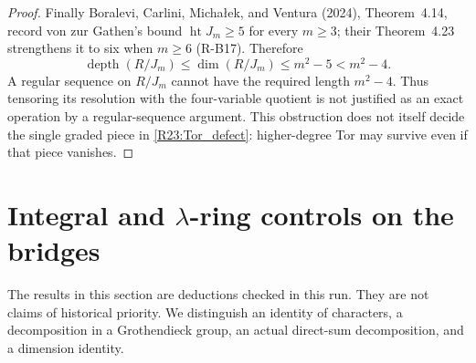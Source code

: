 \documentclass[11pt,a4paper]{article}
\theoremstyle{definition}\newtheorem{definition}{Definition}
\begin{document}
\begin{proof}
Finally Boralevi, Carlini, Micha{\l}ek, and Ventura (2024),
Theorem~4.14, record von zur Gathen's bound
$\operatorname{ht}J_m\geq5$ for every $m\geq3$; their Theorem~4.23
strengthens it to six when $m\geq6$ (R-B17). Therefore
\[
 \operatorname{depth}(R/J_m)
 \leq\dim(R/J_m)\leq m^2-5<m^2-4.
\]
A regular sequence on $R/J_m$ cannot have the required length
$m^2-4$. Thus tensoring its resolution with the four-variable
quotient is not justified as an exact operation by a regular-sequence
argument. This obstruction does not itself decide the single graded
piece in \eqref{R23:Tor_defect}: higher-degree Tor may survive even
if that piece vanishes.
\end{proof}




\section{Integral and $\lambda$-ring controls on the bridges}\label{sec:root-findings}
The results in this section are deductions checked in this run. They are not claims of historical priority. We distinguish an identity of characters, a decomposition in a Grothendieck group, an actual direct-sum decomposition, and a dimension identity.
\end{document}
